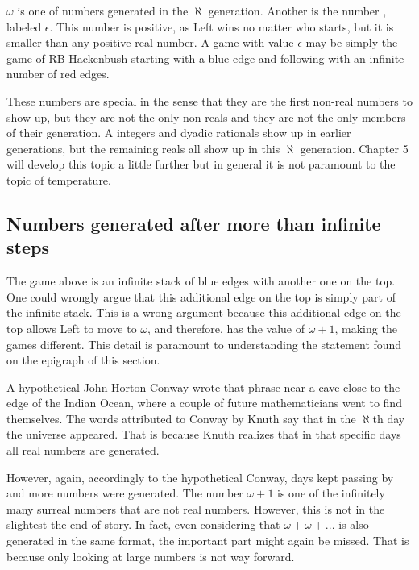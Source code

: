 $\omega$ is one of numbers generated in the $\aleph$ generation. Another is the number , labeled $\epsilon$. This number is positive, as Left wins no matter who starts, but it is smaller than any positive real number. A game with value $\epsilon$ may be simply the game of RB-Hackenbush starting with a blue edge and following with an infinite number of red edges.

These numbers are special in the sense that they are the first non-real numbers to show up, but they are not the only non-reals and they are not the only members of their generation. A integers and dyadic rationals show up in earlier generations, but the remaining reals all show up in this $\aleph$ generation. Chapter 5 will develop this topic a little further but in general it is not paramount to the topic of temperature.

\subsection*{Numbers generated after more than infinite steps}



The game above is an infinite stack of blue edges with another one on the top. One could wrongly argue that this additional edge on the top is simply part of the infinite stack. This is a wrong argument because this additional edge on the top allows Left to move to $\omega$, and therefore, has the value of $\omega+1$, making the games different. This detail is paramount to understanding the statement found on the epigraph of this section.

A hypothetical John Horton Conway wrote that phrase near a cave close to the edge of the Indian Ocean, where a couple of future mathematicians went to find themselves. The words attributed to Conway by Knuth say that in the $\aleph$th day the universe appeared. That is because Knuth realizes that in that specific days all real numbers are generated.

However, again, accordingly to the hypothetical Conway, days kept passing by and more numbers were generated. The number $\omega+1$ is one of the infinitely many surreal numbers that are not real numbers. However, this is not in the slightest the end of story. In fact, even considering that $\omega + \omega + ...$  is also generated in the same format, the important part might again be missed. That is because only looking at large numbers is not way forward.

